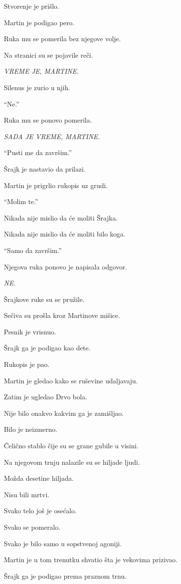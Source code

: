 Stvorenje je prišlo.

Martin je podigao pero.

Ruka mu se pomerila bez njegove volje.

Na stranici su se pojavile reči.

\emph{VREME JE, MARTINE.}

Silenus je zurio u njih.

``Ne.''

Ruka mu se ponovo pomerila.

\emph{SADA JE VREME, MARTINE.}

``Pusti me da završim.''

Šrajk je nastavio da prilazi.

Martin je prigrlio rukopis uz grudi.

``Molim te.''

Nikada nije mislio da će moliti Šrajka.

Nikada nije mislio da će moliti bilo koga.

``Samo da završim.''

Njegova ruka ponovo je napisala odgovor.

\emph{NE.}

\bigskip

Šrajkove ruke su se pružile.

Sečiva su prošla kroz Martinove mišice.

Pesnik je vrisnuo.

Šrajk ga je podigao kao dete.

Rukopis je pao.

Martin je gledao kako se ruševine udaljavaju.

Zatim je ugledao Drvo bola.

Nije bilo onakvo kakvim ga je zamišljao.

Bilo je neizmerno.

Čelično stablo čije su se grane gubile u visini.

Na njegovom trnju nalazile su se hiljade ljudi.

Možda desetine hiljada.

Nisu bili mrtvi.

Svako telo još je osećalo.

Svako se pomeralo.

Svako je bilo samo u sopstvenoj agoniji.

Martin je u tom trenutku shvatio šta je vekovima prizivao.

Šrajk ga je podigao prema praznom trnu.

